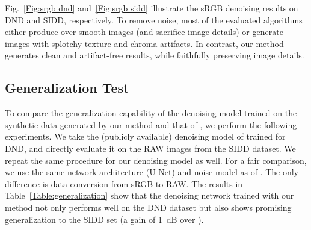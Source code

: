 \documentclass[10pt,twocolumn,letterpaper]{article}
\begin{document}
Fig.~\ref{Fig:srgb dnd} and~\ref{Fig:srgb sidd} illustrate the sRGB denoising results on DND and SIDD, respectively.
To remove noise, most of the evaluated algorithms either produce over-smooth images (and sacrifice image details) or generate images with splotchy texture and chroma artifacts.
In contrast, our method generates clean and artifact-free results, while faithfully preserving image details. 





\subsection{Generalization Test}
To compare the generalization capability of the denoising model trained on the synthetic data generated by our method and that of \cite{Brooks2019}, we perform the following experiments. 
We take the (publicly available) denoising model of \cite{Brooks2019} trained for DND, and directly evaluate it on the RAW images from the SIDD dataset. 
We repeat the same procedure for our denoising model as well.
For a fair comparison, we use the same network architecture (U-Net) and noise model as of \cite{Brooks2019}. 
The only difference is data conversion from sRGB to RAW. 
The results in Table~\ref{Table:generalization} show that the denoising network trained with our method not only performs well on the DND dataset but also shows promising generalization to the SIDD set (a gain of  1~dB over \cite{Brooks2019}). 







\begin{table}[t]
\begin{center}
\caption{Generalization Test. U-Net model is trained only for DND \cite{dnd} with our technique and with the UPI \cite{Brooks2019} method, and directly evaluated on the SIDD dataset \cite{sidd}.}\vspace{-2.5mm}
\label{Table:generalization}
\setlength{\tabcolsep}{16.5pt}
\end{center}\vspace{-1.4em}
\end{table}
\end{document}
